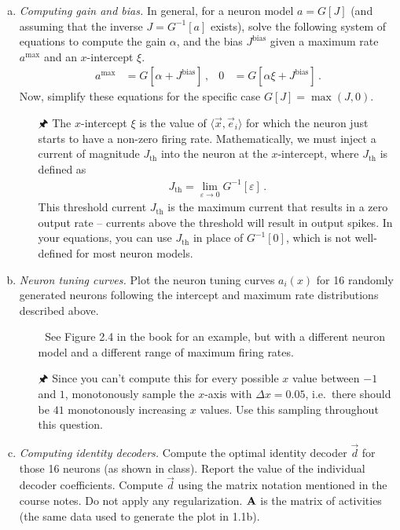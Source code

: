	\begin{enumerate}[a)]
		\item {} \textit{Computing gain and bias.} In general, for a neuron model $a = G[J]$ (and assuming that the inverse $J = G^{-1}[a]$ exists), solve the following system of equations to compute the gain $\alpha$, and the bias $J^\mathrm{bias}$ given a maximum rate $a^\mathrm{max}$ and an $x$-intercept $\xi$.
		\begin{align*}
			a^\mathrm{max} &= G[\alpha + J^\mathrm{bias}] \,, & 0 &= G[\alpha \xi + J^\mathrm{bias}] \,.
		\end{align*}
		Now, simplify these equations for the specific case $G[J] = \max(J, 0)$.
		\begin{itemize}
			\item[{\symbolfont 🖈}] The $x$-intercept $\xi$ is the value of $\langle \vec x, \vec e_i \rangle$ for which the neuron just starts to have a non-zero firing rate. Mathematically, we must inject a current of magnitude $J_\mathrm{th}$ into the neuron at the $x$-intercept, where $J_\mathrm{th}$ is defined as
			\begin{align*}
				J_\mathrm{th} = \lim_{\varepsilon \to 0} G^{-1}[\varepsilon] \,.
			\end{align*}
			This threshold current $J_\mathrm{th}$ is the maximum current that results in a zero output rate -- currents above the threshold will result in output spikes. In your equations, you can use $J_\mathrm{th}$ in place of $G^{-1}[0]$, which is not well-defined for most neuron models.
		\end{itemize}
		\item {} \textit{Neuron tuning curves.} Plot the neuron tuning curves $a_i(x)$ for 16 randomly generated neurons following the intercept and maximum rate distributions described above.
		\begin{itemize}
			\item[{\symbolfont 📖}] See Figure 2.4 in the book for an example, but with a different neuron model and a different range of maximum firing rates.
			\item[{\symbolfont 🖈}] Since you can't compute this for every possible $x$ value between $-1$ and $1$, monotonously sample the $x$-axis with $\Delta x=0.05$, i.e.~there should be $41$ monotonously increasing $x$ values. Use this sampling throughout this question.
		\end{itemize}
		\item {} \textit{Computing identity decoders.} Compute the optimal identity decoder $\vec d$ for those 16 neurons (as shown in class). Report the value of the individual decoder coefficients. Compute $\vec d$ using the matrix notation mentioned in the course notes. Do not apply any regularization. ${\mathbf{A}}$ is the matrix of activities (the same data used to generate the plot in 1.1b).

\end{enumerate}
